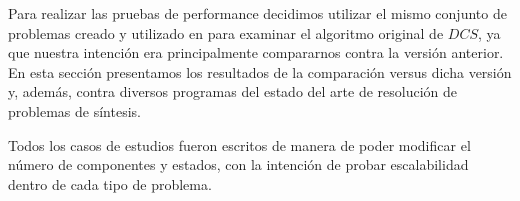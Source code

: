 
Para realizar las pruebas de performance decidimos utilizar el mismo conjunto de problemas creado y utilizado en \cite{tesisDani} para examinar el algoritmo original de $DCS$, ya que nuestra intención era principalmente compararnos contra la versión anterior. En esta sección presentamos los resultados de la comparación versus dicha versión y, además, contra diversos programas del estado del arte de resolución de problemas de síntesis.

Todos los casos de estudios fueron escritos de manera de poder modificar el número de componentes y estados, con la intención de probar escalabilidad dentro de cada tipo de problema.
